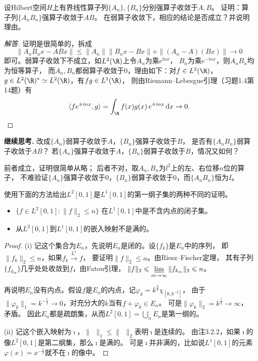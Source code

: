 \begin{23}
    设Hilbert空间$H$上有界线性算子列$\{A_n\},\{B_n\}$分别强算子收敛于$A,B$。
    证明：算子列$\{A_nB_n\}$强算子收敛于$AB$。
    在弱算子收敛下，相应的结论是否成立？并说明理由。
\end{23}
\begin{proof}[解答]
    证明是很简单的，拆成
    \[\|A_nB_nx-ABx\|\leqslant\|A_n\|\|B_nx-Bx\|+\|(A_n-A)(Bx)\|\to0\]
    即可。弱算子收敛下不成立，如$L^2(\R)$上令$A_n$为乘$e^{\mathrm{i}nx}$，
    $B_n$为乘$e^{-\mathrm{i}nx}$，则$A_nB_n$均为恒等算子，
    而$A_n,B_n$都弱算子收敛于$0$，理由如下：对$f \in L^2(\R)$，
    $g \in L^2(\R)^* \simeq L^2(\R)$，有$fg \in L^1(\R)$，
    则由Riemann--Lebesgue引理（习题1.4第14题）有
    \[\la fe^{\pm\mathrm{i}nx},g \ra
    =\int_{\R}f(x)g(x)\,e^{\pm\mathrm{i}nx}\,\mathrm{d}x\to0.\qedhere\]
\end{proof}
\textbf{继续思考.} 改成$\{A_n\}$弱算子收敛于$A$，$\{B_n\}$强算子收敛于$B$，
是否有$\{A_nB_n\}$弱算子收敛于$AB$？
若$\{A_n\}$强算子收敛于$A$，$\{B_n\}$弱算子收敛于$B$，情况又如何？
\begin{proofc}[解答]
    前者成立，证明很简单从略；
    后者不对，取$A_n,B_n$为$l^2$上的左、右位移$n$位的算子，
    不难验证$\{A_n\}$强算子收敛于$0$，$\{B_n\}$弱算子收敛于$0$，而$\{A_nB_n\}$恒为$I$。
\end{proofc}

\begin{24}
    使用下面的方法给出$L^2[0,1]$是$L^1[0,1]$的第一纲子集的两种不同的证明。
    \begin{itemize}
    \item[(i)] $\{f \in L^2[0,1]:\|f\|_2 \leqslant n\}$
    在$L^1[0,1]$中是不含内点的闭子集。
    \item[(ii)] 从$L^2[0,1]$到$L^1[0,1]$的嵌入映射不是满的。
    \end{itemize}
\end{24}
\begin{proof}
    (i) 记这个集合为$E_n$，先说明$E_n$是闭的。设$\{f_k\}$是$E_n$中的序列，
    即$\|f_k\|_2 \leqslant n$，如果$f_k\stackrel{L^1}{\rightarrow}f$，
    要证明$\|f\|_2 \leqslant n$。由Riesz--Fischer定理，
    其有子列$\{f_{k_m}\}$几乎处处收敛到$f$，由Fatou引理，
    $\|f\|_2 \leqslant \varliminf\limits_{m\to\infty}\|f_{k_m}\|_2 \leqslant n$。

    再说明$E_n$没有内点。假设$f$是$E_n$的内点，记$\varphi_k=k^\frac{3}{2}\chi_{[0,k^{-2}]}$，
    由于$\|\varphi_k\|_1=k^{-\frac{1}{2}}\to0$，对充分大的$k$当有$f+\varphi_k \in E_n$。
    可是$\|\varphi_k\|_2=k^\frac{1}{2}\to\infty$，矛盾。
    因此$E_n$都是疏朗集，从而$L^2[0,1]=\bigcup\limits_n E_n$是第一纲的。

    (ii) 记这个嵌入映射为$\imath$，$\|\ \ \|_1\leqslant\|\ \ \|_2$表明$\imath$是连续的。
    由注3.2.2，如果$\imath$的像$L^2[0,1]$是第二纲集，那么$\imath$是满的。
    可是$\imath$并非满的，比如说$L^1[0,1]$的元素$\varphi(x)=x^{-\frac{1}{2}}$就不在$\imath$的像中。
\end{proof}

